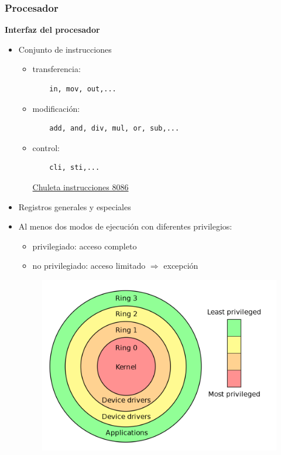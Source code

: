 \documentclass{article}
\begin{document}
\subsubsection{Procesador}
\textbf{Interfaz del procesador}
\begin{itemize}
\item Conjunto de instrucciones
	\begin{itemize}
	\item transferencia: \begin{verbatim}
	in, mov, out,...
	\end{verbatim}
	
	\item modificación: \begin{verbatim}
	add, and, div, mul, or, sub,...
	\end{verbatim}
	
	\item control: \begin{verbatim}
	cli, sti,...
	\end{verbatim}
	
	\href{http://jegerlehner.ch/intel/IntelCodeTable_es.pdf}{Chuleta instrucciones 8086}
	\end{itemize}

\item Registros generales y especiales

\item Al menos dos modos de ejecución con diferentes privilegios:
	\begin{itemize}
	\item privilegiado: acceso completo
	\item no privilegiado: acceso limitado $\Rightarrow$ excepción
	\end{itemize}
	
\begin{figure}[h]
\centering
\includegraphics[scale=1,width=\textwidth]{privilegios.png}
\end{figure}
\end{itemize}
\end{document}
